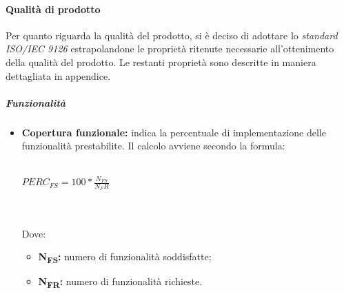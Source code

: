 \paragraph{Qualità di prodotto}
Per quanto riguarda la qualità del prodotto, si è deciso di adottare lo
\textit{standard ISO/IEC 9126\glos} estrapolandone le proprietà ritenute necessarie
all'ottenimento della qualità del prodotto. Le restanti proprietà sono descritte in maniera dettagliata in appendice.
\subparagraph*{Funzionalità}
\begin{itemize}
	\item \textbf{Copertura funzionale:} indica la percentuale di implementazione delle funzionalità prestabilite. Il calcolo avviene secondo la formula:\\\\
	\centerline{
		\begin{math}
		PERC_{FS}=100*\frac{N_{FS}}{N_FR}
		\end{math}
	}
	\\\\
	Dove:
	\begin{itemize}
		\item \textbf{N\textsubscript{FS}:} numero di funzionalità soddisfatte;
		\item \textbf{N\textsubscript{FR}:} numero di funzionalità richieste.
	\end{itemize}
\end{itemize}

